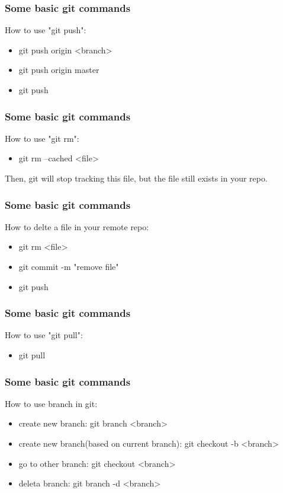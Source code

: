 \documentclass[aspectratio=169]{beamer}
\begin{document}
\begin{frame}
  \frametitle{Some basic git commands}
  How to use "git push":
  \begin{itemize}
    \item git push origin <branch>
    \item git push origin master
    \item git push
  \end{itemize}
\end{frame}

\begin{frame}
  \frametitle{Some basic git commands}
  How to use "git rm":
  \begin{itemize}
    \item git rm --cached <file>
  \end{itemize}
  Then, git will stop tracking this file, but the file still exists in your repo.
\end{frame}

\begin{frame}
  \frametitle{Some basic git commands}
  How to delte a file in your remote repo:
  \begin{itemize}
    \item git rm <file>
    \item git commit -m "remove file"
    \item git push
  \end{itemize}
\end{frame}

\begin{frame}
  \frametitle{Some basic git commands}
  How to use "git pull":
  \begin{itemize}
    \item git pull
  \end{itemize}
\end{frame}

\begin{frame}
  \frametitle{Some basic git commands}
  How to use branch in git:
  \begin{itemize}
    \item create new branch: git branch <branch>
    \item create new branch(based on current branch): git checkout -b <branch>
    \item go to other branch: git checkout <branch>
    \item deleta branch: git branch -d <branch>
  \end{itemize}
\end{frame}
\end{document}
